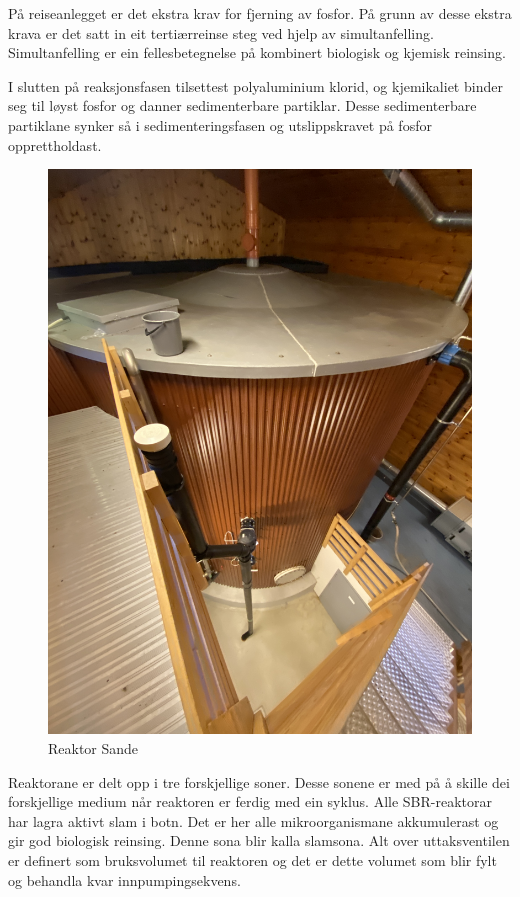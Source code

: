 På reiseanlegget er det ekstra krav for fjerning av fosfor. På grunn av desse ekstra krava
er det satt in eit tertiærreinse steg ved hjelp av simultanfelling.
Simultanfelling er ein fellesbetegnelse på kombinert biologisk og kjemisk reinsing.

I slutten på reaksjonsfasen tilsettest polyaluminium klorid, og kjemikaliet binder seg til
løyst fosfor og danner sedimenterbare partiklar. Desse sedimenterbare partiklane synker 
så i sedimenteringsfasen og utslippskravet på fosfor opprettholdast.

\begin{figure}[htbp]
    \centering
    \includegraphics[angle=-90, width=1\textwidth]{Bilder/BildeReaktor.jpg}
    \caption{Reaktor Sande}\label{fig:reaktorsoner}
\end{figure}

\newpage

Reaktorane er delt opp i tre forskjellige soner. Desse sonene er med på å skille
dei forskjellige medium når reaktoren er ferdig med ein syklus.
Alle SBR-reaktorar har lagra aktivt slam i botn. Det er her alle mikroorganismane akkumulerast
og gir god biologisk reinsing. Denne sona blir kalla slamsona.\newline
Alt over uttaksventilen er definert som bruksvolumet til reaktoren og det
er dette volumet som blir fylt og behandla kvar innpumpingsekvens.

